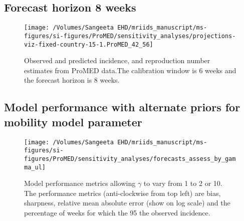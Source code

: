 \documentclass[11pt,]{article}
\begin{document}
\hypertarget{forecast-horizon-8-weeks-11}{%
  \subsection{Forecast horizon 8 weeks}\label{forecast-horizon-8-weeks-11}}

\begin{figure}

  {
    \centering
    \texttt{[image: /Volumes/Sangeeta EHD/mriids\_manuscript/ms-figures/si-figures/ProMED/sensitivity\_analyses/projections-viz-fixed-country-15-1.ProMED\_42\_56]} 
  }
  \caption{Observed and predicted incidence, and reproduction number
    estimates from ProMED data.The calibration window is 6 weeks and
    the forecast horizon is 8 weeks.}
  \label{fig:pm68gamma}
\end{figure}

\hypertarget{model-performance-with-alternate-priors-for-mobility-model-parameter}{%
  \subsection{Model performance with alternate priors for mobility
    model parameter}\label{model-performance-with-alternate-priors-for-mobility-model-parameter}}

\begin{figure}
  {
    \centering
    \texttt{[image: /Volumes/Sangeeta EHD/mriids\_manuscript/ms-figures/si-figures/ProMED/sensitivity\_analyses/forecasts\_assess\_by\_gamma\_ul]} 
  }

  \caption{Model performance metrics allowing $\gamma$ to vary from
    1 to 2 or 10. The performance metrics (anti-clockwise from top left) are
    bias, sharpness, relative mean absolute error (show on log scale) and
    the percentage of weeks for which the 95%
    the observed incidence.}\label{fig:perfbygamma}
\end{figure}
\end{document}
